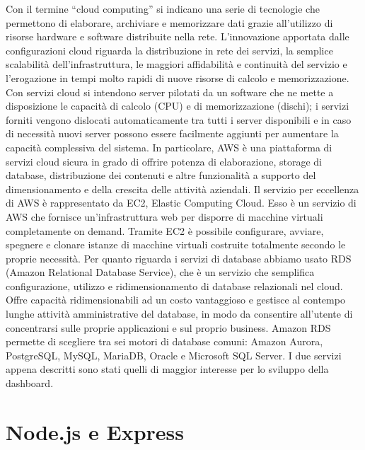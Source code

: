 Con il termine “cloud computing” si indicano una serie di tecnologie che permettono di elaborare, archiviare e memorizzare dati grazie all'utilizzo di risorse hardware e software distribuite nella rete.
L’innovazione apportata dalle configurazioni cloud riguarda la distribuzione in rete dei servizi, la semplice scalabilità dell'infrastruttura, le maggiori affidabilità e continuità del servizio e l’erogazione in tempi molto rapidi di nuove risorse di calcolo e memorizzazione.
Con servizi cloud si intendono server pilotati da un software che ne mette a disposizione le capacità di calcolo (CPU) e di memorizzazione (dischi); i servizi forniti vengono dislocati automaticamente tra tutti i server disponibili e in caso di necessità nuovi server possono essere facilmente aggiunti per aumentare la capacità complessiva del sistema. In particolare, AWS è una piattaforma di servizi cloud sicura in grado di offrire potenza di elaborazione, storage di database, distribuzione dei contenuti e altre funzionalità a supporto del dimensionamento e della crescita delle attività aziendali.
Il servizio per eccellenza di AWS è rappresentato da EC2, Elastic Computing Cloud. Esso è un servizio di AWS che fornisce un’infrastruttura web per disporre di macchine virtuali completamente on demand. Tramite EC2 è possibile configurare, avviare, spegnere e clonare istanze di macchine virtuali costruite totalmente secondo le proprie necessità. Per quanto riguarda i servizi di database abbiamo usato RDS (Amazon Relational Database Service), che è un servizio che semplifica configurazione, utilizzo e ridimensionamento di database relazionali nel cloud. Offre capacità ridimensionabili ad un costo vantaggioso e gestisce al contempo lunghe attività amministrative del database, in modo da consentire all'utente di concentrarsi sulle proprie applicazioni e sul proprio business. Amazon RDS permette di scegliere tra sei motori di database comuni: Amazon Aurora, PostgreSQL, MySQL, MariaDB, Oracle e Microsoft SQL Server. I due servizi appena descritti sono stati quelli di maggior interesse per lo sviluppo della dashboard.

\section{Node.js e Express}
\label{sec:Node.js e express}

